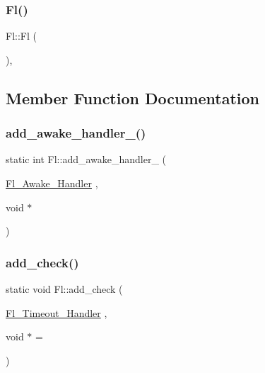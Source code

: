 \subsubsection{\texorpdfstring{Fl()}{Fl()}}
{\footnotesize\ttfamily Fl\+::\+Fl (\begin{DoxyParamCaption}{ }\end{DoxyParamCaption})\hspace{0.3cm}{\ttfamily [inline]}, {\ttfamily [private]}}



\subsection{Member Function Documentation}
\mbox{\label{class_fl_a9d0ff41e9133d3ccdbbea4ddce82a80a}} 
\subsubsection{\texorpdfstring{add\+\_\+awake\+\_\+handler\+\_\+()}{add\_awake\_handler\_()}}
{\footnotesize\ttfamily static int Fl\+::add\+\_\+awake\+\_\+handler\+\_\+ (\begin{DoxyParamCaption}\item[{\hyperlink{group__callback__functions_ga28b44ff2052ca0b06d0da852fadd42c0}{Fl\+\_\+\+Awake\+\_\+\+Handler}}]{,  }\item[{void $\ast$}]{ }\end{DoxyParamCaption})\hspace{0.3cm}{\ttfamily [static]}}

\mbox{\label{class_fl_a6dae9c21900ebc33864f008b5a4fe1b0}} 
\subsubsection{\texorpdfstring{add\+\_\+check()}{add\_check()}}
{\footnotesize\ttfamily static void Fl\+::add\+\_\+check (\begin{DoxyParamCaption}\item[{\hyperlink{group__callback__functions_ga17b5c6570394124287997166a50ff07a}{Fl\+\_\+\+Timeout\+\_\+\+Handler}}]{,  }\item[{void $\ast$}]{ = {} }\end{DoxyParamCaption})\hspace{0.3cm}{\ttfamily [static]}}

